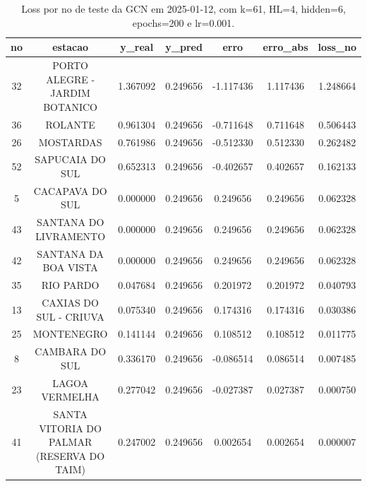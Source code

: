 \begin{table}[h]
\centering
\caption{Loss por no de teste da GCN em 2025-01-12, com k=61, HL=4, hidden=6, epochs=200 e lr=0.001.}
\label{tab:gcn_loss_k61_hl4_h6_e200_d20250112}
\begin{tabular}{ccccccc}
\toprule
no & estacao & y\_real & y\_pred & erro & erro\_abs & loss\_no \\
\midrule
32 & PORTO ALEGRE - JARDIM BOTANICO & 1.367092 & 0.249656 & -1.117436 & 1.117436 & 1.248664 \\
36 & ROLANTE & 0.961304 & 0.249656 & -0.711648 & 0.711648 & 0.506443 \\
26 & MOSTARDAS & 0.761986 & 0.249656 & -0.512330 & 0.512330 & 0.262482 \\
52 & SAPUCAIA DO SUL & 0.652313 & 0.249656 & -0.402657 & 0.402657 & 0.162133 \\
5 & CACAPAVA DO SUL & 0.000000 & 0.249656 & 0.249656 & 0.249656 & 0.062328 \\
43 & SANTANA DO LIVRAMENTO & 0.000000 & 0.249656 & 0.249656 & 0.249656 & 0.062328 \\
42 & SANTANA DA BOA VISTA & 0.000000 & 0.249656 & 0.249656 & 0.249656 & 0.062328 \\
35 & RIO PARDO & 0.047684 & 0.249656 & 0.201972 & 0.201972 & 0.040793 \\
13 & CAXIAS DO SUL - CRIUVA & 0.075340 & 0.249656 & 0.174316 & 0.174316 & 0.030386 \\
25 & MONTENEGRO & 0.141144 & 0.249656 & 0.108512 & 0.108512 & 0.011775 \\
8 & CAMBARA DO SUL & 0.336170 & 0.249656 & -0.086514 & 0.086514 & 0.007485 \\
23 & LAGOA VERMELHA & 0.277042 & 0.249656 & -0.027387 & 0.027387 & 0.000750 \\
41 & SANTA VITORIA DO PALMAR (RESERVA DO TAIM) & 0.247002 & 0.249656 & 0.002654 & 0.002654 & 0.000007 \\
\bottomrule
\end{tabular}
\end{table}

